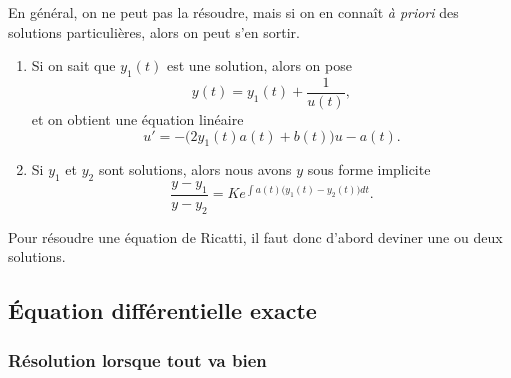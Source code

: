 En général, on ne peut pas la résoudre, mais si on en connaît \emph{à priori} des solutions particulières, alors on peut s'en sortir.

\begin{enumerate}

\item
Si on sait que $y_1(t)$ est une solution, alors on pose
\begin{equation}
	y(t)=y_1(t)+\frac{1}{ u(t) },
\end{equation}
et on obtient une équation linéaire
\begin{equation}
	u'=-\big( 2y_1(t)a(t)+b(t) \big)u-a(t).
\end{equation}

\item
Si $y_1$ et $y_2$ sont solutions, alors nous avons $y$ sous forme implicite
\begin{equation}
	\frac{ y-y_1 }{ y-y_2 }=K e^{\int a(t)\big( y_1(t)-y_2(t) \big)dt}.
\end{equation}
\end{enumerate}

Pour résoudre une équation de Ricatti, il faut donc d'abord deviner une ou deux solutions.

\subsection{Équation différentielle exacte}
\label{SubSecEqDiffExacte}

\subsubsection{Résolution lorsque tout va bien}

